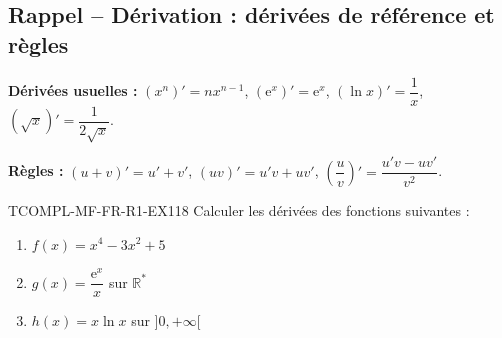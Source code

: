 

\subsection*{Rappel -- Dérivation : dérivées de référence et règles}

\textbf{Dérivées usuelles :} $(x^n)' = n x^{n-1}$, $(\mathrm{e}^x)' = \mathrm{e}^x$, $(\ln x)' = \dfrac{1}{x}$, $(\sqrt{x})' = \dfrac{1}{2\sqrt{x}}$.

\textbf{Règles :} $(u+v)' = u' + v'$, $(uv)' = u'v + uv'$, $\left(\dfrac{u}{v}\right)' = \dfrac{u'v - uv'}{v^2}$.

\begin{exercice}{TCOMPL-MF-FR-R1-EX1}{1}{8}
Calculer les dérivées des fonctions suivantes :
\begin{enumerate}
  \item $f(x) = x^4 - 3x^2 + 5$
  \item $g(x) = \dfrac{\mathrm{e}^x}{x}$ sur $\mathbb{R}^*$
  \item $h(x) = x \ln x$ sur $]0, +\infty[$
\end{enumerate}
\end{exercice}

